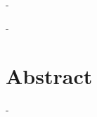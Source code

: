 \documentclass[a4paper,10pt,fleqn,openright]{Quark}
\begin{document}



\restoregeometry



\newpage

\begin{adjustwidth}{0pt}{-\marginBiblio}



\end{adjustwidth}


\newpage

\begin{adjustwidth}{0pt}{-\marginBiblio}

\chapter*{Abstract}
\thispagestyle{fancy}
%



\end{adjustwidth}


\newpage

\begin{adjustwidth}{0pt}{-\marginBiblio}



%
\thispagestyle{fancy}
\setcounter{tocdepth}{1}
\tableofcontents

\end{adjustwidth}


\end{document}
